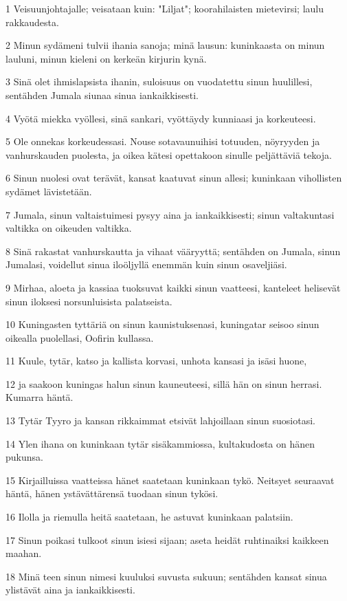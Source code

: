 \par 1 Veisuunjohtajalle; veisataan kuin: "Liljat"; koorahilaisten mietevirsi; laulu rakkaudesta.
\par 2 Minun sydämeni tulvii ihania sanoja; minä lausun: kuninkaasta on minun lauluni, minun kieleni on kerkeän kirjurin kynä.
\par 3 Sinä olet ihmislapsista ihanin, suloisuus on vuodatettu sinun huulillesi, sentähden Jumala siunaa sinua iankaikkisesti.
\par 4 Vyötä miekka vyöllesi, sinä sankari, vyöttäydy kunniaasi ja korkeuteesi.
\par 5 Ole onnekas korkeudessasi. Nouse sotavaunuihisi totuuden, nöyryyden ja vanhurskauden puolesta, ja oikea kätesi opettakoon sinulle peljättäviä tekoja.
\par 6 Sinun nuolesi ovat terävät, kansat kaatuvat sinun allesi; kuninkaan vihollisten sydämet lävistetään.
\par 7 Jumala, sinun valtaistuimesi pysyy aina ja iankaikkisesti; sinun valtakuntasi valtikka on oikeuden valtikka.
\par 8 Sinä rakastat vanhurskautta ja vihaat vääryyttä; sentähden on Jumala, sinun Jumalasi, voidellut sinua iloöljyllä enemmän kuin sinun osaveljiäsi.
\par 9 Mirhaa, aloeta ja kassiaa tuoksuvat kaikki sinun vaatteesi, kanteleet helisevät sinun iloksesi norsunluisista palatseista.
\par 10 Kuningasten tyttäriä on sinun kaunistuksenasi, kuningatar seisoo sinun oikealla puolellasi, Oofirin kullassa.
\par 11 Kuule, tytär, katso ja kallista korvasi, unhota kansasi ja isäsi huone,
\par 12 ja saakoon kuningas halun sinun kauneuteesi, sillä hän on sinun herrasi. Kumarra häntä.
\par 13 Tytär Tyyro ja kansan rikkaimmat etsivät lahjoillaan sinun suosiotasi.
\par 14 Ylen ihana on kuninkaan tytär sisäkammiossa, kultakudosta on hänen pukunsa.
\par 15 Kirjailluissa vaatteissa hänet saatetaan kuninkaan tykö. Neitsyet seuraavat häntä, hänen ystävättärensä tuodaan sinun tykösi.
\par 16 Ilolla ja riemulla heitä saatetaan, he astuvat kuninkaan palatsiin.
\par 17 Sinun poikasi tulkoot sinun isiesi sijaan; aseta heidät ruhtinaiksi kaikkeen maahan.
\par 18 Minä teen sinun nimesi kuuluksi suvusta sukuun; sentähden kansat sinua ylistävät aina ja iankaikkisesti.

